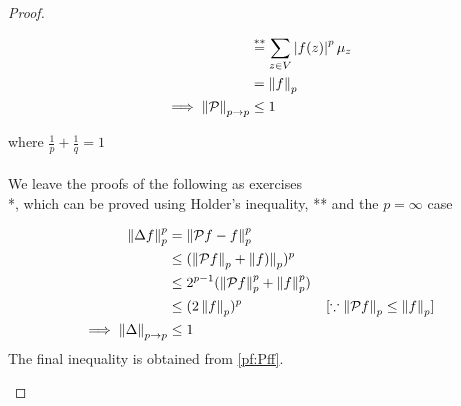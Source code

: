 \documentclass[main]{subfiles}
\begin{document}
\begin{prop}
\begin{proof}
\begin{enumerate}
\begin{equation}
\begin{aligned}
                                                               & \stackrel{**}{=} \sum_{z \in V}\left\lvert f(z)\right\rvert^p\mu_z                                                                                  \\
                                                               & = \left\lVert f\right\rVert_{p}                                                                                                                     \\
                          \implies \left\lVert\mathcal{P}\right\rVert_{p \to p} & \leq 1                                                                                                                            \\
                      \end{aligned}
                      \label{pf:Pff}
                  \end{equation}

                  where $\frac{1}{p} + \frac{1}{q} = 1$\\\\
                  We leave the proofs of the following as exercises\\
                  *, which can be proved using Holder's inequality,
                  ** and the
                  $p = \infty$ case

                  \begin{align*}
                      \left\lVert\Delta f\right\rVert_{p}^p            & = \left\lVert\mathcal{P}f - f\right\rVert_{p}^p                                                      \\
                                                      & \leq (\left\lVert\mathcal{P}f\right\rVert_{p} + \left\lVert f)\right\rVert_{p})^p                                      \\
                                                      & \leq 2^{p-1}(\left\lVert\mathcal{P}f\right\rVert_{p}^p + \left\lVert f\right\rVert_{p}^p)                              \\
                                                      & \leq (2\left\lVert f\right\rVert_{p})^p \hspace{6em}[\because\left\lVert\mathcal{P}f\right\rVert_{p} \leq \left\lVert f\right\rVert_{p}] \\
                      \implies \left\lVert\Delta\right\rVert_{p \to p} & \leq 1                                                                              \\
                  \end{align*}
                  The final inequality is obtained from \eqref{pf:Pff}.
        \end{enumerate}
    \end{proof}
\end{prop}
\end{document}
